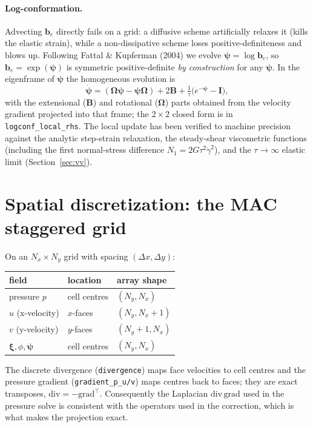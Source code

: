 \documentclass[11pt]{article}
\newcommand{\xiv}{\bm{\xi}}
\newcommand{\bten}{\bm{b}}
\begin{document}
\paragraph{Log-conformation.} Advecting $\bten_e$ directly fails on a grid: a
diffusive scheme artificially relaxes it (kills the elastic strain), while a
non-dissipative scheme loses positive-definiteness and blows up. Following Fattal \&
Kupferman (2004) we evolve $\bm\psi=\log\bten_e$, so $\bten_e=\exp(\bm\psi)$ is
symmetric positive-definite \emph{by construction} for any $\bm\psi$. In the
eigenframe of $\bm\psi$ the homogeneous evolution is
\begin{equation}
\dot{\bm\psi} = (\bm\Omega\bm\psi-\bm\psi\bm\Omega) + 2\bm B
 + \tfrac{1}{\tau}\bigl(e^{-\bm\psi}-\bm I\bigr),
\end{equation}
with the extensional ($\bm B$) and rotational ($\bm\Omega$) parts obtained from the
velocity gradient projected into that frame; the $2\times2$ closed form is in
\texttt{logconf\_local\_rhs}. The local update has been verified to machine
precision against the analytic step-strain relaxation, the steady-shear viscometric
functions (including the first normal-stress difference $N_1=2G\tau^2\dot\gamma^2$),
and the $\tau\!\to\!\infty$ elastic limit (Section~\ref{sec:vv}).

\section{Spatial discretization: the MAC staggered grid}
On an $N_x\times N_y$ grid with spacing $(\Delta x,\Delta y)$:
\begin{center}
\begin{tabular}{lll}
\toprule
field & location & array shape \\
\midrule
pressure $p$ & cell centres & $(N_y,N_x)$ \\
$u$ (x-velocity) & $x$-faces & $(N_y,N_x{+}1)$ \\
$v$ (y-velocity) & $y$-faces & $(N_y{+}1,N_x)$ \\
$\xiv,\phi,\bm\psi$ & cell centres & $(N_y,N_x)$ \\
\bottomrule
\end{tabular}
\end{center}
The discrete divergence (\texttt{divergence}) maps face velocities to cell centres
and the pressure gradient (\texttt{gradient\_p\_u/v}) maps centres back to faces;
they are exact transposes, $\mathrm{div}=-\mathrm{grad}^{\!\top}$. Consequently the
Laplacian $\mathrm{div}\,\mathrm{grad}$ used in the pressure solve is consistent with
the operators used in the correction, which is what makes the projection exact.
\end{document}
